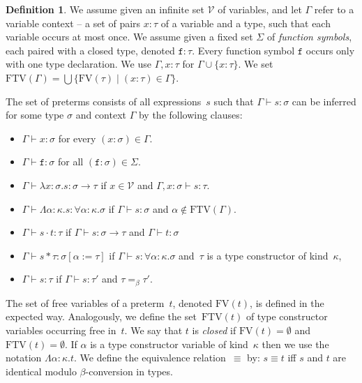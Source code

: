 \documentclass[a4paper,UKenglish,cleveref,autoref,numberwithinsect]{lipics-v2019}
\theoremstyle{definition}
\newtheorem{defn}[theorem]{Definition}
\newcommand{\Vars}{\mathcal{V}}
\newcommand{\arrtype}{\rightarrow}
\newcommand{\quant}[2]{\forall #1.#2}
\newcommand{\app}[2]{#1 \cdot #2}
\newcommand{\tapp}[2]{#1 * #2}
\newcommand{\subst}[2]{#1:=#2}
\newcommand{\abs}[2]{\lambda #1.#2}
\newcommand{\tabs}[2]{\Lambda #1.#2}
\newcommand{\FTV}{\mathrm{FTV}}
\newcommand{\FV}{\mathrm{FV}}
\begin{document}
\begin{defn}\label{def_preterms}
  We assume given an infinite set $\Vars$ of variables, and let
  $\Gamma$ refer to a variable context -- a set of pairs $x : \tau$ of
  a variable and a type, such that each variable occurs at most
  once. We assume given a fixed set $\Sigma$ of \emph{function
    symbols}, each paired with a closed type, denoted $\mathtt{f} :
  \tau$.  Every function symbol $\mathtt{f}$ occurs only with one type
  declaration. We use $\Gamma,x:\tau$ for $\Gamma \cup \{x:\tau\}$. We
  set $\FTV(\Gamma) = \bigcup\{\FV(\tau) \mid (x : \tau) \in
  \Gamma\}$.

  The set of preterms consists of all expressions~$s$ such that
  $\Gamma \vdash s : \sigma$ can be inferred for some type $\sigma$
  and context $\Gamma$ by the following clauses:
  \begin{itemize}
  \item $\Gamma \vdash x : \sigma$ for every $(x : \sigma) \in \Gamma$.
  \item $\Gamma \vdash \mathtt{f} : \sigma$ for all
    $(\mathtt{f} : \sigma) \in \Sigma$.
  \item $\Gamma \vdash \abs{x:\sigma}{s} : \sigma \arrtype \tau$ if $x
    \in \Vars$ and $\Gamma, x : \sigma \vdash s : \tau$.
  \item $\Gamma \vdash \tabs{\alpha:\kappa}{s} : \quant{\alpha:\kappa}{\sigma}$ if
    $\Gamma \vdash s : \sigma$ and $\alpha \notin \FTV(\Gamma)$.
  \item $\Gamma \vdash \app{s}{t} : \tau$ if $\Gamma \vdash s : \sigma
    \arrtype \tau$ and $\Gamma \vdash t : \sigma$
  \item $\Gamma \vdash \tapp{s}{\tau} : \sigma[\subst{\alpha}{\tau}]$
    if $\Gamma \vdash s : \quant{\alpha:\kappa}{\sigma}$ and~$\tau$ is
    a type constructor of kind~$\kappa$,
  \item $\Gamma \vdash s : \tau$ if $\Gamma \vdash s : \tau'$ and
    $\tau =_\beta \tau'$.
  \end{itemize}
  The set of free variables of a preterm~$t$, denoted $\FV(t)$, is
  defined in the expected way. Analogously, we define the
  set~$\FTV(t)$ of type constructor variables occurring free
  in~$t$. We say that $t$ is \emph{closed} if $\FV(t) = \emptyset$ and
  $\FTV(t) = \emptyset$. If $\alpha$ is a type constructor variable of
  kind~$\kappa$ then we use the notation $\tabs{\alpha:\kappa}{t}$.
  We define the equivalence relation~$\equiv$ by: $s \equiv t$ iff $s$
  and $t$ are identical modulo $\beta$-conversion in types.
\end{defn}
\end{document}
